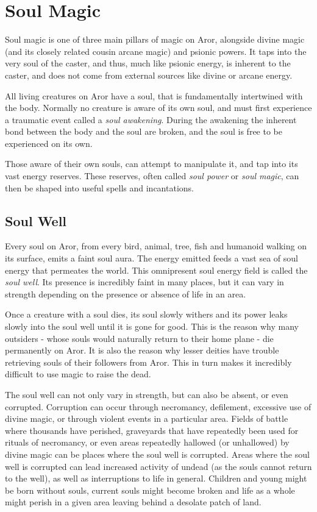 \section{Soul Magic}
\label{sec:Soul Magic}

Soul magic is one of three main pillars of magic on Aror, alongside divine
magic (and its closely related cousin arcane magic) and psionic
powers. It taps into the very soul of the caster, and thus, much like psionic
energy, is inherent to the caster, and does not come from external sources
like divine or arcane energy.

All living creatures on Aror have a soul, that is fundamentally intertwined
with the body. Normally no creature is aware of its own soul, and must first
experience a traumatic event called a \emph{soul awakening}. During the
awakening the inherent bond between the body and the soul are broken, and the
soul is free to be experienced on its own.

Those aware of their own souls, can attempt to manipulate it, and tap into
its vast energy reserves. These reserves, often called \emph{soul power} or
\emph{soul magic}, can then be shaped into useful spells and incantations.

\subsection{Soul Well}
\label{sec:Soul Well}

Every soul on Aror, from every bird, animal, tree, fish and humanoid walking
on its surface, emits a faint soul aura. The energy emitted feeds a vast sea
of soul energy that permeates the world. This omnipresent soul energy field is
called the \emph{soul well}. Its presence is incredibly faint in many places,
but it can vary in strength depending on the presence or absence of life in an
area.

Once a creature with a soul dies, its soul slowly withers and its power leaks
slowly into the soul well until it is gone for good. This is the reason why
many outsiders - whose souls would naturally return to their home plane - die
permanently on Aror. It is also the reason why lesser deities have trouble
retrieving souls of their followers from Aror. This in turn makes it incredibly
difficult to use magic to raise the dead.

The soul well can not only vary in strength, but can also be absent, or even
corrupted. Corruption can occur through necromancy, defilement, excessive use
of divine magic, or through violent events in a particular area. Fields of
battle where thousands have perished, graveyards that have repeatedly been
used for rituals of necromancy, or even areas repeatedly hallowed (or
unhallowed) by divine magic can be places where the soul well is corrupted.
Areas where the soul well is corrupted can lead increased activity of undead
(as the souls cannot return to the well), as well as interruptions to life in
general. Children and young might be born without souls, current souls might
become broken and life as a whole might perish in a given area leaving behind
a desolate patch of land.

